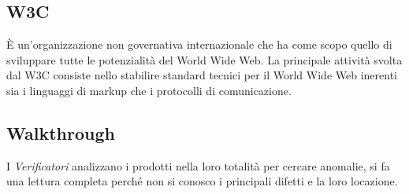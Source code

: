 \section{}
\subsection*{W3C} È un'organizzazione non governativa internazionale che ha come scopo quello di sviluppare tutte le potenzialità del World Wide Web. La principale attività svolta dal W3C consiste nello stabilire standard tecnici per il World Wide Web inerenti sia i linguaggi di markup che i protocolli di comunicazione.

\subsection*{Walkthrough} I \textit{Verificatori} analizzano i prodotti nella loro totalità per cercare anomalie, si fa una lettura completa perché non si conosco i principali difetti e la loro locazione.

\newpage